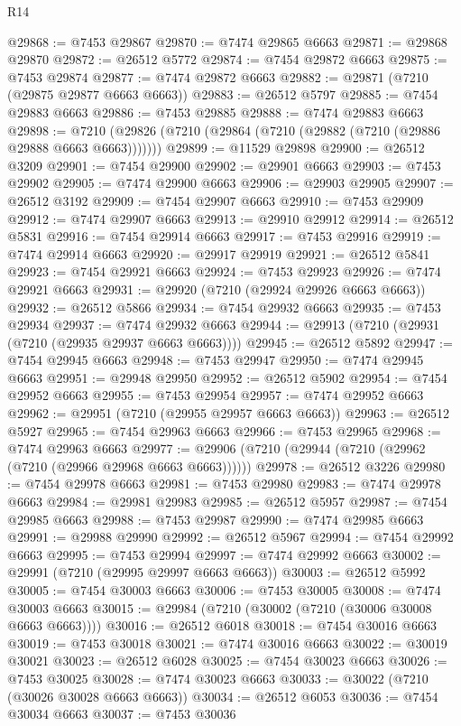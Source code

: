 \begin{lexlean}{R14}
\begin{coremodule}
@29868 := @7453 @29867
@29870 := @7474 @29865 @6663
@29871 := @29868 @29870
@29872 := @26512 @5772
@29874 := @7454 @29872 @6663
@29875 := @7453 @29874
@29877 := @7474 @29872 @6663
@29882 := @29871 (@7210 (@29875 @29877 @6663 @6663))
@29883 := @26512 @5797
@29885 := @7454 @29883 @6663
@29886 := @7453 @29885
@29888 := @7474 @29883 @6663
@29898 := @7210 (@29826 (@7210 (@29864 (@7210 (@29882 (@7210 (@29886 @29888 @6663 @6663)))))))
@29899 := @11529 @29898
@29900 := @26512 @3209
@29901 := @7454 @29900
@29902 := @29901 @6663
@29903 := @7453 @29902
@29905 := @7474 @29900 @6663
@29906 := @29903 @29905
@29907 := @26512 @3192
@29909 := @7454 @29907 @6663
@29910 := @7453 @29909
@29912 := @7474 @29907 @6663
@29913 := @29910 @29912
@29914 := @26512 @5831
@29916 := @7454 @29914 @6663
@29917 := @7453 @29916
@29919 := @7474 @29914 @6663
@29920 := @29917 @29919
@29921 := @26512 @5841
@29923 := @7454 @29921 @6663
@29924 := @7453 @29923
@29926 := @7474 @29921 @6663
@29931 := @29920 (@7210 (@29924 @29926 @6663 @6663))
@29932 := @26512 @5866
@29934 := @7454 @29932 @6663
@29935 := @7453 @29934
@29937 := @7474 @29932 @6663
@29944 := @29913 (@7210 (@29931 (@7210 (@29935 @29937 @6663 @6663))))
@29945 := @26512 @5892
@29947 := @7454 @29945 @6663
@29948 := @7453 @29947
@29950 := @7474 @29945 @6663
@29951 := @29948 @29950
@29952 := @26512 @5902
@29954 := @7454 @29952 @6663
@29955 := @7453 @29954
@29957 := @7474 @29952 @6663
@29962 := @29951 (@7210 (@29955 @29957 @6663 @6663))
@29963 := @26512 @5927
@29965 := @7454 @29963 @6663
@29966 := @7453 @29965
@29968 := @7474 @29963 @6663
@29977 := @29906 (@7210 (@29944 (@7210 (@29962 (@7210 (@29966 @29968 @6663 @6663))))))
@29978 := @26512 @3226
@29980 := @7454 @29978 @6663
@29981 := @7453 @29980
@29983 := @7474 @29978 @6663
@29984 := @29981 @29983
@29985 := @26512 @5957
@29987 := @7454 @29985 @6663
@29988 := @7453 @29987
@29990 := @7474 @29985 @6663
@29991 := @29988 @29990
@29992 := @26512 @5967
@29994 := @7454 @29992 @6663
@29995 := @7453 @29994
@29997 := @7474 @29992 @6663
@30002 := @29991 (@7210 (@29995 @29997 @6663 @6663))
@30003 := @26512 @5992
@30005 := @7454 @30003 @6663
@30006 := @7453 @30005
@30008 := @7474 @30003 @6663
@30015 := @29984 (@7210 (@30002 (@7210 (@30006 @30008 @6663 @6663))))
@30016 := @26512 @6018
@30018 := @7454 @30016 @6663
@30019 := @7453 @30018
@30021 := @7474 @30016 @6663
@30022 := @30019 @30021
@30023 := @26512 @6028
@30025 := @7454 @30023 @6663
@30026 := @7453 @30025
@30028 := @7474 @30023 @6663
@30033 := @30022 (@7210 (@30026 @30028 @6663 @6663))
@30034 := @26512 @6053
@30036 := @7454 @30034 @6663
@30037 := @7453 @30036

\end{coremodule}
\end{lexlean}
